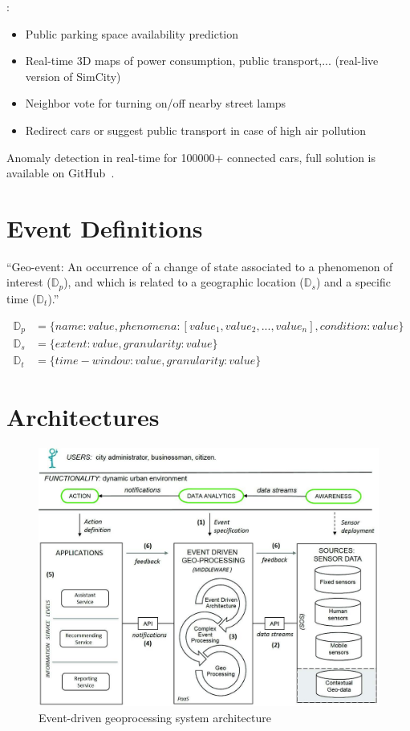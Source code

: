 \documentclass[]{scrartcl}
\begin{document}
\cite[p.~30]{Presser.2014}:
\begin{itemize}
	\item Public parking space availability prediction
	\item Real-time 3D maps of power consumption, public transport,... (real-live version of SimCity)
	\item Neighbor vote for turning on/off nearby street lamps
	\item Redirect cars or suggest public transport in case of high air pollution
\end{itemize}

Anomaly detection in real-time for 100000+ connected cars, full solution is available on GitHub~\cite{Wahner.2019}.

\section{Event Definitions}

\enquote{Geo-event: An occurrence of a change of state associated to a phenomenon of interest ($\mathbb{D}_p$), and which is related to a geographic location ($\mathbb{D}_s$) and a specific time ($\mathbb{D}_t$).}~\cite[p.~3]{Morales.2015}

\begin{align*}
	\mathbb{D}_p &= \{name: value, phenomena: [value_1, value_2, ..., value_n], condition: value\} \\
	\mathbb{D}_s &= \{extent: value, granularity: value\} \\
	\mathbb{D}_t &= \{time-window: value, granularity: value\}
\end{align*}


\section{Architectures}

\begin{figure}[h]
	\centering
	\includegraphics[width=\textwidth]{Morales_2015}
	\caption{Event-driven geoprocessing system architecture~\cite[p.~3]{Morales.2015}}
	\label{fig:morales-arch}
\end{figure}
\end{document}
